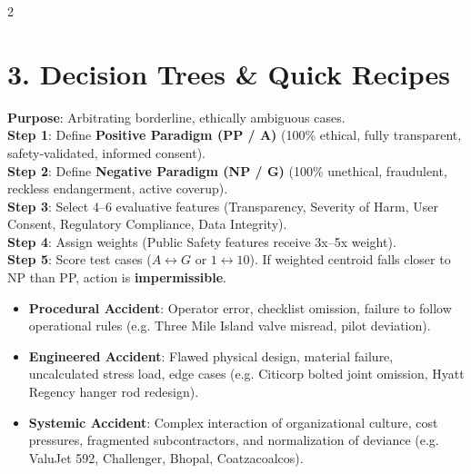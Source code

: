 \documentclass[9pt,a4paper]{extarticle}
\begin{document}
\begin{multicols}{2}
\section{3. Decision Trees \& Quick Recipes}

\begin{tcolorbox}[compact,colframe=darkgreen,title={3.1 Line-Drawing Technique}]
\textbf{Purpose}: Arbitrating borderline, ethically ambiguous cases.\\
\textbf{Step 1}: Define \textbf{Positive Paradigm (PP / A)} (100\% ethical, fully transparent, safety-validated, informed consent).\\
\textbf{Step 2}: Define \textbf{Negative Paradigm (NP / G)} (100\% unethical, fraudulent, reckless endangerment, active coverup).\\
\textbf{Step 3}: Select 4--6 evaluative features (Transparency, Severity of Harm, User Consent, Regulatory Compliance, Data Integrity).\\
\textbf{Step 4}: Assign weights (Public Safety features receive 3x--5x weight).\\
\textbf{Step 5}: Score test cases ($A \leftrightarrow G$ or $1 \leftrightarrow 10$). If weighted centroid falls closer to NP than PP, action is \textbf{impermissible}.
\end{tcolorbox}

\begin{tcolorbox}[compact,colframe=darkgreen,title={3.2 Accident Classification (3 Types)}]
\begin{itemize}[leftmargin=9pt]
  \item \textbf{Procedural Accident}: Operator error, checklist omission, failure to follow operational rules (e.g. Three Mile Island valve misread, pilot deviation).
  \item \textbf{Engineered Accident}: Flawed physical design, material failure, uncalculated stress load, edge cases (e.g. Citicorp bolted joint omission, Hyatt Regency hanger rod redesign).
  \item \textbf{Systemic Accident}: Complex interaction of organizational culture, cost pressures, fragmented subcontractors, and normalization of deviance (e.g. ValuJet 592, Challenger, Bhopal, Coatzacoalcos).
\end{itemize}
\end{tcolorbox}


\end{multicols}
\end{document}
